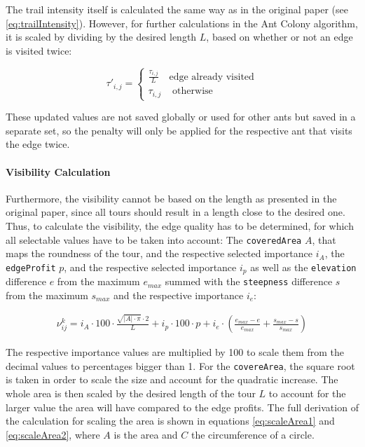 The trail intensity itself is calculated the same way as in the original paper (see \ref{eq:trailIntensity}).
However, for further calculations in the Ant Colony algorithm, it is scaled by dividing by the desired length $L$, based on whether or not an edge is visited twice:

\begin{equation}
	\label{eq:scaledTrailIntensity}
	\tau'_{i,j} = \begin{cases}
		 \frac{\tau_{i,j}}{L} &\text{edge already visited}\\
		\tau_{i,j} &\text{ otherwise}
	\end{cases}
\end{equation}

These updated values are not saved globally or used for other ants but saved in a separate set, so the penalty will only be applied for the respective ant that visits the edge twice.

\paragraph{Visibility Calculation}

Furthermore, the visibility cannot be based on the length as presented in the original paper, since all tours should result in a length close to the desired one.
Thus, to calculate the visibility, the edge quality has to be determined, for which all selectable values have to be taken into account:
The \texttt{coveredArea} $A$, that maps the roundness of the tour, and the respective selected importance $i_A$, the \texttt{edgeProfit} $p$, and the respective selected importance $i_p$ as well as the \texttt{elevation} difference $e$ from the maximum $e_{max}$ summed with the \texttt{steepness} difference $s$ from the maximum $s_{max}$ and the respective importance $i_e$:

\begin{equation}
	\label{eq:newEdgeVisibility}
	\begin{split}
	\nu_{ij}^k = i_A \cdot 100 \cdot \frac{\sqrt{|A|\cdot \pi} \cdot 2 }{L} 
	+  i_p \cdot 100 \cdot p
	+ i_e \cdot \left(\frac{e_{max} - e}{e_{max}} + \frac{s_{max} - s}{s_{max}}\right)
	\end{split}
\end{equation}

The respective importance values are multiplied by 100 to scale them from the decimal values to percentages bigger than 1. 
For the \texttt{covereArea}, the square root is taken in order to scale the size and account for the quadratic increase. 
The whole area is then scaled by the desired length of the tour $L$ to account for the larger value the area will have compared to the edge profits. 
The full derivation of the calculation for scaling the area is shown in equations \ref{eq:scaleArea1} and \ref{eq:scaleArea2}, where $A$ is the area and $C$ the circumference of a circle.


